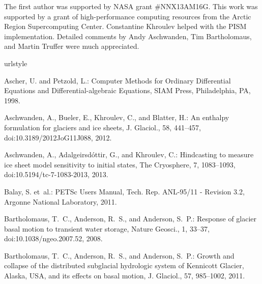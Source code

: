 \documentclass[gmd]{copernicus}   %
\begin{document}
\begin{acknowledgements}
The first author was supported by NASA grant \#NNX13AM16G.  This work was supported by a grant of high-performance computing resources from the Arctic Region Supercomputing Center.  Constantine Khroulev helped with the PISM implementation.  Detailed comments by Andy Aschwanden, Tim Bartholomaus, and Martin Truffer were much appreciated.
\end{acknowledgements}


\begin{thebibliography}{68}
\providecommand{\natexlab}[1]{#1}
\providecommand{\url}[1]{{\tt #1}}
\providecommand{\urlprefix}{URL }
\expandafter\ifx\csname urlstyle\endcsname\relax
  \providecommand{\doi}[1]{doi:\discretionary{}{}{}#1}\else
  \providecommand{\doi}{doi:\discretionary{}{}{}\begingroup
  \urlstyle{rm}\Url}\fi

Ascher, U. and Petzold, L.: Computer {M}ethods for {O}rdinary {D}ifferential
  {E}quations and {D}ifferential-algebraic {E}quations, SIAM Press,
  Philadelphia, PA, 1998.

Aschwanden, A., Bueler, E., Khroulev, C., and Blatter, H.: An enthalpy
  formulation for glaciers and ice sheets, J. Glaciol., 58, 441--457,
  \doi{10.3189/2012JoG11J088}, 2012.

Aschwanden, A., Adalgeirsd{\'o}ttir, G., and Khroulev, C.: Hindcasting to
  measure ice sheet model sensitivity to initial states, The Cryosphere, 7,
  1083--1093, \doi{10.5194/tc-7-1083-2013}, 2013.

Balay, S. et~al.: {PETS}c {U}sers {M}anual, Tech. Rep. ANL-95/11 - Revision
  3.2, Argonne National Laboratory, 2011.

Bartholomaus, T.~C., Anderson, R.~S., and Anderson, S.~P.: Response of glacier
  basal motion to transient water storage, Nature Geosci., 1, 33--37,
  \doi{10.1038/ngeo.2007.52}, 2008.

Bartholomaus, T.~C., Anderson, R.~S., and Anderson, S.~P.: Growth and collapse
  of the distributed subglacial hydrologic system of {K}ennicott {G}lacier,
  {A}laska, {USA}, and its effects on basal motion, J. Glaciol., 57, 985--1002,
  2011.


\end{thebibliography}
\end{document}
